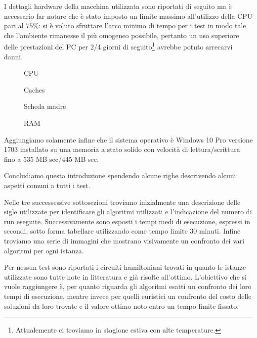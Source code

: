 \documentclass[11pt]{article}
\begin{document}
I dettagli hardware della macchina utilizzata sono riportati di seguito ma è necessario far notare che è stato imposto un limite massimo all'utilizzo della CPU pari al $75\%$: si è voluto sfruttare l'arco minimo di tempo per i test in modo tale che l'ambiente rimanesse il più omogeneo possibile, pertanto un uso superiore delle prestazioni del PC per 2/4 giorni di seguito\footnote{Attualemente ci troviamo in stagione estiva con alte temperature.} avrebbe potuto arrecarvi danni.

\begin{figure}[htbp]
    \centering
    \caption{CPU}
\end{figure}

\begin{figure}[htbp]
    \centering
    \caption{Caches}
\end{figure}

\begin{figure}[htbp]
    \centering
    \caption{Scheda madre}
\end{figure}

\begin{figure}[htbp]
    \centering
    \caption{RAM}
\end{figure}


Aggiungiamo solamente infine che il sistema operativo è Windows 10 Pro versione 1703 installato su una memoria a stato solido con velocità di lettura/scrittura fino a 535 MB sec/445 MB sec.

Concludiamo questa introduzione spendendo alcune righe descrivendo alcuni aspetti comuni a tutti i test.

Nelle tre successessive sottosezioni troviamo inizialmente una descrizione delle sigle utilizzate per identificare gli algoritmi utilizzati e l'indicazione del numero di run eseguite. Successivamente sono esposti i tempi medi di esecuzione, espressi in secondi, sotto forma tabellare utilizzando come tempo limite $30$ minuti. Infine troviamo una serie di immagini che mostrano visivamente un confronto dei vari algoritmi per ogni istanza.

Per nessun test sono riportati i circuiti hamiltoniani trovati in quanto le istanze utilizzate sono tutte note in litteratura e già risolte all'ottimo. L'obiettivo che si vuole raggiungere è, per quanto riguarda gli algoritmi esatti un confronto dei loro tempi di esecuzione, mentre invece per quelli euristici un confronto del costo delle soluzioni da loro trovate e il valore ottimo noto entro un tempo limite fissato.
\end{document}
